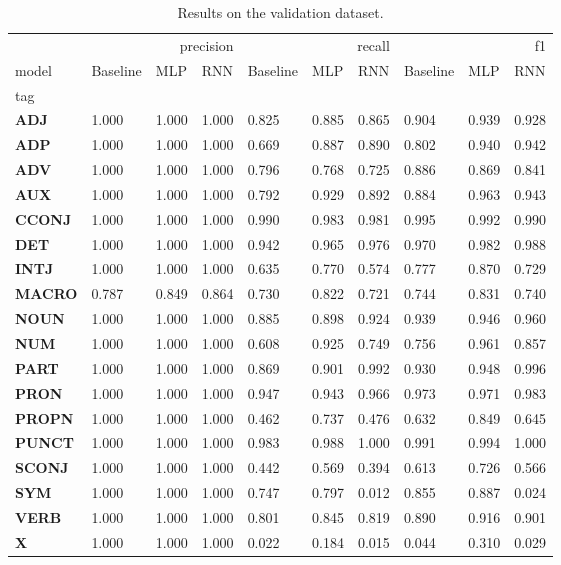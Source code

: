 \begin{table}
\caption{Results on the validation dataset.}
\label{tab::ex_2_valid}
\begin{tabular}{|l||l||l||l||l||l||l||l||l||l|}
\toprule
 & \multicolumn{3}{r}{precision} & \multicolumn{3}{r}{recall} & \multicolumn{3}{r}{f1} \\
model & Baseline & MLP & RNN & Baseline & MLP & RNN & Baseline & MLP & RNN \\
tag &  &  &  &  &  &  &  &  &  \\
\midrule
\textbf{ADJ} & 1.000 & 1.000 & 1.000 & 0.825 & 0.885 & 0.865 & 0.904 & 0.939 & 0.928 \\
\textbf{ADP} & 1.000 & 1.000 & 1.000 & 0.669 & 0.887 & 0.890 & 0.802 & 0.940 & 0.942 \\
\textbf{ADV} & 1.000 & 1.000 & 1.000 & 0.796 & 0.768 & 0.725 & 0.886 & 0.869 & 0.841 \\
\textbf{AUX} & 1.000 & 1.000 & 1.000 & 0.792 & 0.929 & 0.892 & 0.884 & 0.963 & 0.943 \\
\textbf{CCONJ} & 1.000 & 1.000 & 1.000 & 0.990 & 0.983 & 0.981 & 0.995 & 0.992 & 0.990 \\
\textbf{DET} & 1.000 & 1.000 & 1.000 & 0.942 & 0.965 & 0.976 & 0.970 & 0.982 & 0.988 \\
\textbf{INTJ} & 1.000 & 1.000 & 1.000 & 0.635 & 0.770 & 0.574 & 0.777 & 0.870 & 0.729 \\
\textbf{MACRO} & 0.787 & 0.849 & 0.864 & 0.730 & 0.822 & 0.721 & 0.744 & 0.831 & 0.740 \\
\textbf{NOUN} & 1.000 & 1.000 & 1.000 & 0.885 & 0.898 & 0.924 & 0.939 & 0.946 & 0.960 \\
\textbf{NUM} & 1.000 & 1.000 & 1.000 & 0.608 & 0.925 & 0.749 & 0.756 & 0.961 & 0.857 \\
\textbf{PART} & 1.000 & 1.000 & 1.000 & 0.869 & 0.901 & 0.992 & 0.930 & 0.948 & 0.996 \\
\textbf{PRON} & 1.000 & 1.000 & 1.000 & 0.947 & 0.943 & 0.966 & 0.973 & 0.971 & 0.983 \\
\textbf{PROPN} & 1.000 & 1.000 & 1.000 & 0.462 & 0.737 & 0.476 & 0.632 & 0.849 & 0.645 \\
\textbf{PUNCT} & 1.000 & 1.000 & 1.000 & 0.983 & 0.988 & 1.000 & 0.991 & 0.994 & 1.000 \\
\textbf{SCONJ} & 1.000 & 1.000 & 1.000 & 0.442 & 0.569 & 0.394 & 0.613 & 0.726 & 0.566 \\
\textbf{SYM} & 1.000 & 1.000 & 1.000 & 0.747 & 0.797 & 0.012 & 0.855 & 0.887 & 0.024 \\
\textbf{VERB} & 1.000 & 1.000 & 1.000 & 0.801 & 0.845 & 0.819 & 0.890 & 0.916 & 0.901 \\
\textbf{X} & 1.000 & 1.000 & 1.000 & 0.022 & 0.184 & 0.015 & 0.044 & 0.310 & 0.029 \\
\bottomrule
\end{tabular}
\end{table}
